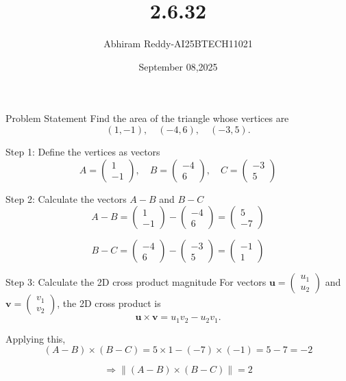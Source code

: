 \documentclass{beamer}
\title 
{2.6.32}
\date{September 08,2025}
\author 
{Abhiram Reddy-AI25BTECH11021}
\begin{document}
\frame{\titlepage}
\begin{frame}{Problem Statement}
Find the area of the triangle whose vertices are
\[
(1, -1), \quad (-4, 6), \quad (-3, 5).
\]
\end{frame}

\begin{frame}{Step 1: Define the vertices as vectors}
\[
A = \begin{pmatrix} 1 \\ -1 \end{pmatrix}, \quad
B = \begin{pmatrix} -4 \\ 6 \end{pmatrix}, \quad
C = \begin{pmatrix} -3 \\ 5 \end{pmatrix}
\]
\end{frame}

\begin{frame}{Step 2: Calculate the vectors \( A - B \) and \( B - C \)}
\[
A - B = \begin{pmatrix} 1 \\ -1 \end{pmatrix} - \begin{pmatrix} -4 \\ 6 \end{pmatrix} 
= \begin{pmatrix} 5 \\ -7 \end{pmatrix}
\]

\[
B - C = \begin{pmatrix} -4 \\ 6 \end{pmatrix} - \begin{pmatrix} -3 \\ 5 \end{pmatrix} 
= \begin{pmatrix} -1 \\ 1 \end{pmatrix}
\]
\end{frame}

\begin{frame}{Step 3: Calculate the 2D cross product magnitude}
For vectors \(\mathbf{u} = \begin{pmatrix} u_1 \\ u_2 \end{pmatrix}\) and \(\mathbf{v} = \begin{pmatrix} v_1 \\ v_2 \end{pmatrix}\), the 2D cross product is
\[
\mathbf{u} \times \mathbf{v} = u_1 v_2 - u_2 v_1.
\]

Applying this,
\[
(A-B) \times (B-C) = 5 \times 1 - (-7) \times (-1) = 5 - 7 = -2
\]

\[
\Rightarrow \| (A-B) \times (B-C) \| = 2
\]
\end{frame}
\end{document}
